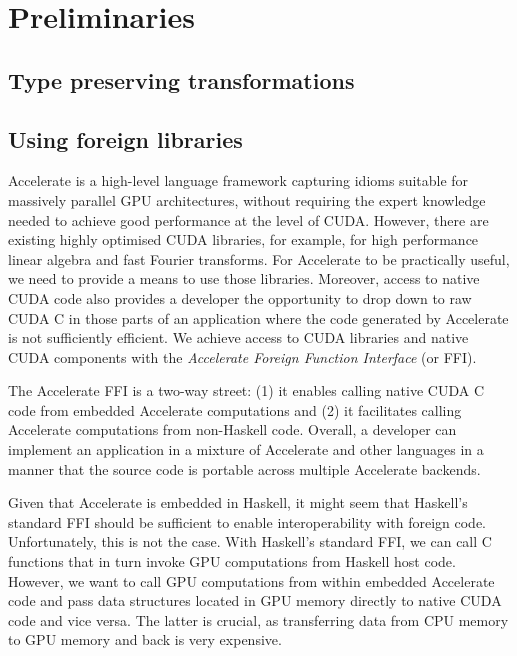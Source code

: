 \chapter{Preliminaries}

\section{Type preserving transformations}

\section{Using foreign libraries}
\label{sec:foreign-import}



Accelerate is a high-level language framework capturing idioms suitable for massively parallel GPU architectures, without requiring the expert knowledge needed to achieve good performance at the level of CUDA. However, there are existing highly optimised CUDA libraries, for example, for high performance linear algebra and fast Fourier transforms. For Accelerate to be practically useful, we need to provide a means to use those libraries. Moreover, access to native CUDA code also provides a developer the opportunity to drop down to raw CUDA C in those parts of an application where the code generated by Accelerate is not sufficiently efficient. We achieve access to CUDA libraries and native CUDA components with the  \emph{Accelerate Foreign Function Interface} (or FFI).

The Accelerate FFI is a two-way street: (1) it enables calling native CUDA C code from embedded Accelerate computations and (2) it facilitates calling Accelerate computations from non-Haskell code. Overall, a developer can implement an application in a mixture of Accelerate and other languages in a manner that the source code is portable across multiple Accelerate backends.

Given that Accelerate is embedded in Haskell, it might seem  that Haskell's standard FFI should be sufficient to enable interoperability with foreign code. Unfortunately, this is not the case. With Haskell's standard FFI, we can call C functions that in turn invoke GPU computations from Haskell host code. However, we want to call GPU computations from within embedded Accelerate code and pass data structures located in GPU memory directly to native CUDA code and vice versa. The latter is crucial, as transferring data from CPU memory to GPU memory and back is very expensive.

